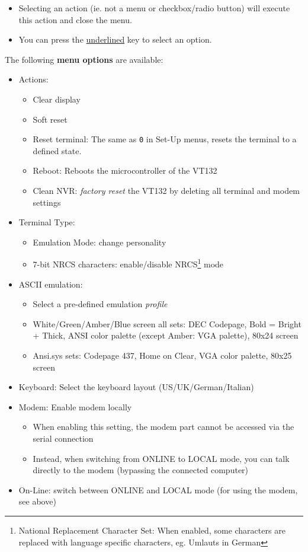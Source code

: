 \begin{itemize}[leftmargin=1em]
 \item Selecting an action (ie. not a menu or checkbox/radio button) will execute this action and close the menu.
 \item You can press the \underline{underlined} key to select an option.
\end{itemize}

The following \textbf{menu options} are available:

\begin{itemize}[leftmargin=1em]
 \item Actions:
 \begin{itemize}[noitemsep]
  \item Clear display
  \item Soft reset
  \item Reset terminal: The same as \texttt{0} in Set-Up menus, resets the terminal to a defined state.
  \item Reboot: Reboots the microcontroller of the VT132
  \item Clean NVR: \textit{factory reset} the VT132 by deleting all terminal and modem settings
 \end{itemize}
 \item Terminal Type:
 \begin{itemize}[noitemsep]
  \item Emulation Mode: change personality
  \item 7-bit NRCS characters: enable/disable NRCS\footnote{National Replacement Character Set: When enabled, some characters are replaced with language specific 
	characters, eg. Umlauts in German} mode
 \end{itemize}
 \item ASCII emulation:
 \begin{itemize}[noitemsep]
  \item Select a pre-defined emulation \textit{profile}
  \item White/Green/Amber/Blue screen all sets: DEC Codepage, Bold = Bright + Thick, ANSI color palette (except Amber: VGA palette), 80x24 screen
  \item Ansi.sys sets: Codepage 437, Home on Clear, VGA color palette, 80x25 screen
 \end{itemize}
 \item Keyboard: Select the keyboard layout (US/UK/German/Italian)
 \item Modem: Enable modem locally
 \begin{itemize}[noitemsep]
  \item When enabling this setting, the modem part cannot be accessed via the serial connection
  \item Instead, when switching from ONLINE to LOCAL mode, you can talk directly to the modem (bypassing the connected computer)
 \end{itemize}
 \item On-Line: switch between ONLINE and LOCAL mode (for using the modem, see above)
\end{itemize}

